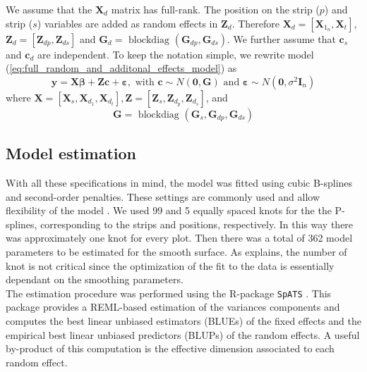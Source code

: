 We assume that the $\boldsymbol{X}_{d}$ matrix has full-rank. 
The position on the strip ($p$) and strip ($s$) variables are added as random effects in $\mathbf{Z}_{d}$. 
Therefore $\mathbf{X}_{d} = 
\left[ 
	\mathbf{X}_{1_n},\mathbf{X}_{t} 
\right]$, 
$\boldsymbol{Z}_{d}=
\left[
	\boldsymbol{Z}_{dp}, \boldsymbol{Z}_{ds}
\right]$ and 
$\boldsymbol{G}_{d}= 
\text{ blockdiag }
\left(
	\boldsymbol{G}_{dp}, \boldsymbol{G}_{ds}
\right)$. 
We further assume that $\boldsymbol{c}_s$ and $\boldsymbol{c}_d$ are independent.
To keep the notation simple, we rewrite model (\ref{eq:full_random_and_additonal_effects_model}) as
\begin{equation}
    \boldsymbol{y}=
    \boldsymbol{X} \boldsymbol{\beta}+
    \boldsymbol{Z} \boldsymbol{c}+
    \boldsymbol{\varepsilon}, 
    \text { with } 
    \boldsymbol{c} \sim N(\mathbf{0}, \boldsymbol{G}) 
    \text { and } 
    \boldsymbol{\varepsilon} \sim N\left(\mathbf{0}, \sigma^{2} \boldsymbol{I}_{n}\right)
\end{equation}
where $\boldsymbol{X}=
\left[
	\boldsymbol{X}_{s}, \boldsymbol{X}_{d_{1}}, \mathbf{X}_{d_{t}} 
\right], 
\boldsymbol{Z}=
\left[
	\boldsymbol{Z}_{s}, \boldsymbol{Z}_{d_{p}}, \mathbf{Z}_{d_{s}}
\right]$, and 
\begin{equation}
    \boldsymbol{G}=\text { blockdiag }\left(\boldsymbol{G}_{s}, \boldsymbol{G}_{dp}, \boldsymbol{G}_{ds} \right)
\end{equation}

\subsection{Model estimation}
With all these specifications in mind, the model was fitted using cubic B-splines and second-order penalties. These settings are commonly used and allow flexibility of the model \parencite{rodriguez-alvarez_correcting_2018,rodriguez-alvarez_spatial_2016,rodriguez-alvarez_fast_2015}. We used 99 and 5 equally spaced knots for the the P-splines, corresponding to the strips and positions, respectively. In this way there was approximately one knot for every plot. Then there was a total of 362 model parameters to be estimated for the smooth surface. As \textcite{rodriguez-alvarez_correcting_2018} explains, the number of knot is not critical since the optimization of the fit to the data is essentially dependant on the smoothing parameters.\\
The estimation procedure was performed using the R-package \texttt{SpATS} \parencite{rodriguez-alvarez_spats:_2016}. This package provides a REML-based estimation of the variances components and computes the best linear unbiased estimators (BLUEs) of the fixed effects and the empirical best linear unbiased predictors (BLUPs) of the random effects. A useful by-product of this computation is the effective dimension associated to each random effect.

